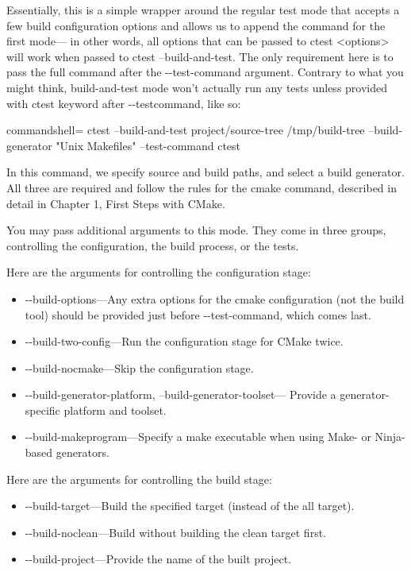 Essentially, this is a simple wrapper around the regular test mode that accepts a few build configuration options and allows us to append the command for the first mode— in other words, all options that can be passed to ctest <options> will work when passed to ctest --build-and-test. The only requirement here is to pass the full command after the -{}-test-command argument. Contrary to what you might think, build-and-test mode won't actually run any tests unless provided with ctest keyword after -{}-testcommand, like so:

\begin{tcblisting}{commandshell={}}
ctest --build-and-test project/source-tree /tmp/build-tree
--build-generator "Unix Makefiles" --test-command ctest
\end{tcblisting}

In this command, we specify source and build paths, and select a build generator. All three are required and follow the rules for the cmake command, described in detail in Chapter 1, First Steps with CMake.

You may pass additional arguments to this mode. They come in three groups, controlling the configuration, the build process, or the tests.

Here are the arguments for controlling the configuration stage:

\begin{itemize}
\item 
-{}-build-options—Any extra options for the cmake configuration (not the build tool) should be provided just before -{}-test-command, which comes last.

\item 
-{}-build-two-config—Run the configuration stage for CMake twice.

\item 
-{}-build-nocmake—Skip the configuration stage.

\item 
-{}-build-generator-platform, --build-generator-toolset— Provide a generator-specific platform and toolset.

\item 
-{}-build-makeprogram—Specify a make executable when using Make- or Ninja-based generators.
\end{itemize}

Here are the arguments for controlling the build stage:

\begin{itemize}
\item 
-{}-build-target—Build the specified target (instead of the all target).
	
\item 
-{}-build-noclean—Build without building the clean target first.
	
\item 
-{}-build-project—Provide the name of the built project.
\end{itemize}

